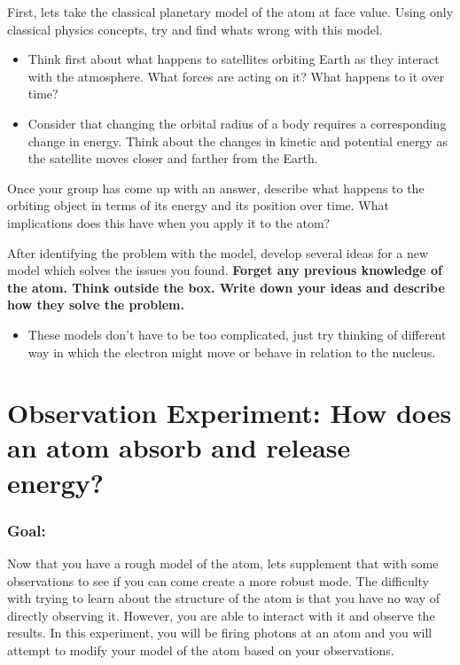 \begin{steps} 
	\item First, lets take the classical planetary model of the atom at face value. Using only classical physics concepts, try and find whats wrong with this model. 
	\begin{itemize} 
		\item Think first about what happens to satellites orbiting Earth as they interact with the atmosphere. What forces are acting on it? What happens to it over time?
		
		\item Consider that changing the orbital radius of a body requires a corresponding change in energy. Think about the changes in kinetic and potential energy as the satellite moves closer and farther from the Earth. 
	\end{itemize}
	\item Once your group has come up with an answer, describe what happens to the orbiting object in terms of its energy and its position over time. What implications does this have when you apply it to the atom?
	
	\item After identifying the problem with the model, develop several ideas for a new model which solves the issues you found. \textbf{Forget any previous knowledge of the atom. Think outside the box. Write down your ideas and describe how they solve the problem.} 
	\begin{itemize}
		\item These models don't have to be too complicated, just try thinking of different way in which the electron might move or behave in relation to the nucleus.
	\end{itemize}
\end{steps}

\section{Observation Experiment: How does an atom absorb and release energy?}

\subsubsection{Goal:}
Now that you have a rough model of the atom, lets supplement that with some observations to see if you can come create a more robust mode. The difficulty with trying to learn about the structure of the atom is that you have no way of directly observing it. However, you are able to interact with it and observe the results. In this experiment, you will be firing photons at an atom and you will attempt to modify your model of the atom based on your observations.
